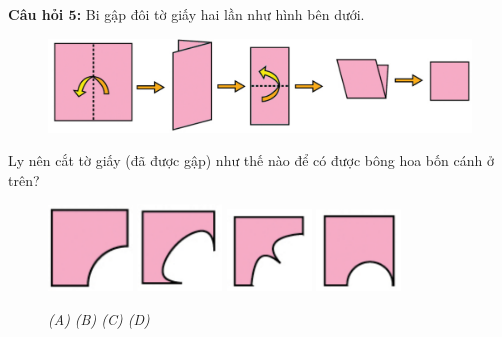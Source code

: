 \textbf{Câu hỏi $\pmb{5}$:} Bi gập đôi tờ giấy hai lần như hình bên dưới.
\begin{figure}[H]
	\vspace*{-5pt}
	\captionsetup{labelformat=empty}
	\centering
	\captionsetup{justification=raggedleft}
	\includegraphics[width =1\textwidth]{cat-12}
	\vspace*{-10pt}
\end{figure}
Ly nên cắt tờ giấy (đã được gập) như thế nào để có được bông hoa bốn cánh ở trên?
\begin{figure}[H]
	\centering
	\captionsetup{labelformat=empty}
	\vspace*{-5pt}
	\captionsetup{justification=centering}
	\includegraphics[width =0.2\textwidth]{cat-13a}
	\hfill
	\includegraphics[width =0.2\textwidth]{cat-13b}
	\hfill
	\includegraphics[width =0.2\textwidth]{cat-13c}
	\hfill
	\includegraphics[width =0.2\textwidth]{cat-13d}	
	\vspace*{-5pt}
	\caption{\small \it (A)\hspace*{40pt} (B)\hspace*{65pt} (C) \hspace*{40pt} (D)}
	\vspace*{-10pt}
\end{figure}
